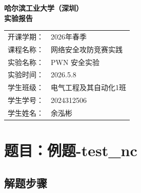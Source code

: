 \documentclass[12pt,a4paper,UTF8]{ctexart}
\begin{document}
\begin{center}
    \Huge \textbf{哈尔滨工业大学（深圳）} \\
    \vspace{1cm}
    \Huge \textbf{实验报告}
\end{center}

\vspace{1.5cm}

\begin{tabular}{ll}
    开课学期： & 2026年春季 \\
    课程名称： & 网络安全攻防竞赛实践 \\
    实验名称： & PWN 安全实验 \\
    实验时间： & 2026.5.8 \\
    学生班级： & 电气工程及其自动化1班 \\
    学生学号： & 2024312506 \\
    学生姓名： & 余泓彬 \\
\end{tabular}

\newpage

\section{题目：例题-test\_nc}
\subsection{解题步骤}
\end{document}
